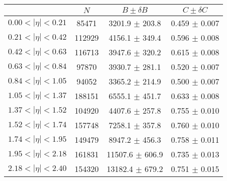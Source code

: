 \begin{tabular}{lccc}
\hline
    &   $N$   & $B \pm \delta B$  &  $C \pm \delta C$ \\
\hline
$0.00 < |\eta| <0.21$          & 85471      & 3201.9     $\pm$ 203.8 & 0.459      $\pm$ 0.007 \\
$0.21 < |\eta| <0.42$          & 112929     & 4156.1     $\pm$ 349.4 & 0.596      $\pm$ 0.008 \\
$0.42 < |\eta| <0.63$          & 116713     & 3947.6     $\pm$ 320.2 & 0.615      $\pm$ 0.008 \\
$0.63 < |\eta| <0.84$          & 97870      & 3930.7     $\pm$ 281.1 & 0.520      $\pm$ 0.007 \\
$0.84 < |\eta| <1.05$          & 94052      & 3365.2     $\pm$ 214.9 & 0.500      $\pm$ 0.007 \\
$1.05 < |\eta| <1.37$          & 188151     & 6555.1     $\pm$ 451.7 & 0.633      $\pm$ 0.008 \\
$1.37 < |\eta| <1.52$          & 104920     & 4407.6     $\pm$ 257.8 & 0.755      $\pm$ 0.010 \\
$1.52 < |\eta| <1.74$          & 157748     & 7258.1     $\pm$ 357.8 & 0.760      $\pm$ 0.010 \\
$1.74 < |\eta| <1.95$          & 149479     & 8947.2     $\pm$ 456.3 & 0.758      $\pm$ 0.011 \\
$1.95 < |\eta| <2.18$          & 161831     & 11507.6    $\pm$ 606.9 & 0.735      $\pm$ 0.013 \\
$2.18 < |\eta| <2.40$          & 154320     & 13182.4    $\pm$ 679.2 & 0.751      $\pm$ 0.015 \\
\hline
\end{tabular}
